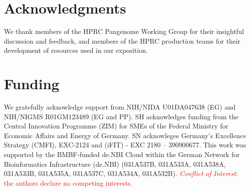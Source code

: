 \documentclass{bioinfo}
\newcommand{\REVIEWED}[1]{{\textcolor{Red}{#1}}}
\begin{document}









\section*{Acknowledgments}

We thank members of the HPRC Pangenome Working Group for their insightful discussion and feedback, and members of the HPRC production teams for their development of resources used in our exposition.

\section*{Funding}

We gratefully acknowledge support from NIH/NIDA U01DA047638 (EG) and NIH/NIGMS R01GM123489 (EG and PP).
SH acknowledges funding from the Central Innovation Programme (ZIM) for SMEs of the Federal Ministry for Economic Affairs and Energy of Germany. SN acknowleges Germany’s Excellence Strategy (CMFI), EXC-2124 and (iFIT) - EXC 2180 – 390900677.
This work was supported by the BMBF-funded de.NBI Cloud within the German Network for Bioinformatics Infrastructure (de.NBI) (031A537B, 031A533A, 031A538A, 031A533B, 031A535A, 031A537C, 031A534A, 031A532B).
\linebreak
\linebreak
\REVIEWED{\textit{Conflict of Interest}: the authors declare no competing interests.}
\end{document}
